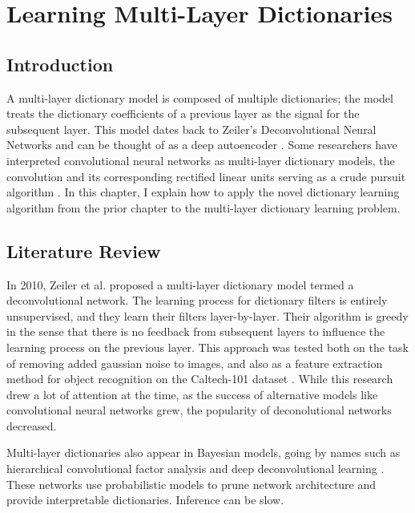 \chapter{Learning Multi-Layer Dictionaries}
\section{Introduction}
A multi-layer dictionary model is composed of multiple dictionaries; the model treats the dictionary coefficients of a previous layer as the signal for the subsequent layer. This model dates back to Zeiler's Deconvolutional Neural Networks \cite{zeiler2010deconvolutional} and can be thought of as a deep autoencoder \cite[Chapter~14]{Goodfellow2016-DeepLearningBook}\cite{Rangamani2018DictLandAE}. Some researchers have interpreted convolutional neural networks as multi-layer dictionary models, the convolution and its corresponding rectified linear units serving as a crude pursuit algorithm \cite{papyan2017convolutional}. In this chapter, I explain how to apply the novel dictionary learning algorithm from the prior chapter to the multi-layer dictionary learning problem.
\section{Literature Review}
In 2010, Zeiler et al. proposed a multi-layer dictionary model termed a deconvolutional network. The learning process for dictionary filters is entirely unsupervised, and they learn their filters layer-by-layer. Their algorithm is greedy in the sense that there is no feedback from subsequent layers to influence the learning process on the previous layer. This approach was tested both on the task of removing added gaussian noise to images, and also as a feature extraction method for object recognition on the Caltech-101 dataset \cite{fei2004-Caltech101}. While this research drew a lot of attention at the time, as the success of alternative models like convolutional neural networks grew, the popularity of deconolutional networks decreased.

Multi-layer dictionaries also appear in Bayesian models, going by names such as hierarchical convolutional factor analysis \cite{chen2011hierarchical}\cite{chen2013deep} and deep deconvolutional learning \cite{pu2014generative}. These networks use probabilistic models to prune network architecture and provide interpretable dictionaries. Inference can be slow.

